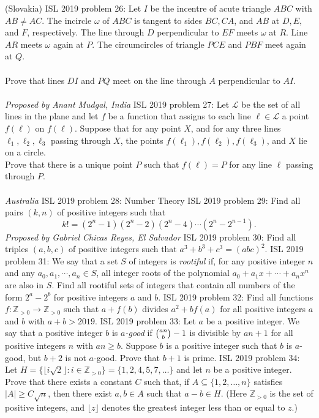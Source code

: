 (Slovakia) 
ISL 2019 problem 26:  Let $I$ be the incentre of acute triangle $ABC$ with $AB\neq AC$. The incircle $\omega$ of $ABC$ is tangent to sides $BC, CA$, and $AB$ at $D, E,$ and $F$, respectively. The line through $D$ perpendicular to $EF$ meets $\omega$ at $R$. Line $AR$ meets $\omega$ again at $P$. The circumcircles of triangle $PCE$ and $PBF$ meet again at $Q$. \\\\
Prove that lines $DI$ and $PQ$ meet on the line through $A$ perpendicular to $AI$. \\\\
\textit{Proposed by Anant Mudgal, India} 
ISL 2019 problem 27:  Let $\mathcal L$ be the set of all lines in the plane and let $f$ be a function that assigns to each line $\ell\in\mathcal L$ a point $f(\ell)$ on $f(\ell)$. Suppose that for any point $X$, and for any three lines $\ell_1,\ell_2,\ell_3$ passing through $X$, the points $f(\ell_1),f(\ell_2),f(\ell_3)$, and $X$ lie on a circle. \\
Prove that there is a unique point $P$ such that $f(\ell)=P$ for any line $\ell$ passing through $P$. \\\\
\textit{Australia} 
ISL 2019 problem 28:  Number Theory 
ISL 2019 problem 29:  Find all pairs $(k,n)$ of positive integers such that
\[ k!=(2^n-1)(2^n-2)(2^n-4)\cdots(2^n-2^{n-1}). \]
\textit{Proposed by Gabriel Chicas Reyes, El Salvador} 
ISL 2019 problem 30:  Find all triples $(a, b, c)$ of positive integers such that $a^3 + b^3 + c^3 = (abc)^2$. 
ISL 2019 problem 31:  We say that a set $S$ of integers is \textit{rootiful} if, for any positive integer $n$ and any $a_0, a_1, \cdots, a_n \in S$, all integer roots of the polynomial $a_0+a_1x+\cdots+a_nx^n$ are also in $S$. Find all rootiful sets of integers that contain all numbers of the form $2^a - 2^b$ for positive integers $a$ and $b$. 
ISL 2019 problem 32:  Find all functions $f:\mathbb Z_{>0}\to \mathbb Z_{>0}$ such that $a+f(b)$ divides $a^2+bf(a)$ for all positive integers $a$ and $b$ with $a+b>2019$. 
ISL 2019 problem 33:  Let $a$ be a positive integer. We say that a positive integer $b$ is \textit{$a$-good} if $\tbinom{an}{b}-1$ is divisible by $an+1$ for all positive integers $n$ with $an \geq b$. Suppose $b$ is a positive integer such that $b$ is $a$-good, but $b+2$ is not $a$-good. Prove that $b+1$ is prime. 
ISL 2019 problem 34:  Let $H = \{ \lfloor i\sqrt{2}\rfloor : i \in \mathbb Z_{>0}\} = \{1,2,4,5,7,\dots \}$ and let $n$ be a positive integer. Prove that there exists a constant $C$ such that, if $A\subseteq \{1,2,\dots, n\}$ satisfies $|A| \ge C\sqrt{n}$, then there exist $a,b\in A$ such that $a-b\in H$. (Here $\mathbb Z_{>0}$ is the set of positive integers, and $\lfloor z\rfloor$ denotes the greatest integer less than or equal to $z$.) 
